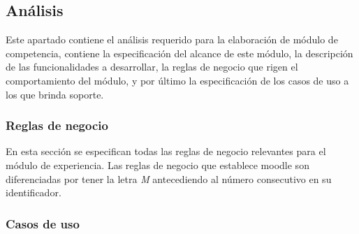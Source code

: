 
\subsection{Análisis}

 Este apartado contiene el análisis requerido para la elaboración de módulo de competencia,
 contiene la especificación del alcance de este módulo, la descripción de las funcionalidades
 a desarrollar, la reglas de negocio que rigen el comportamiento del módulo, y por último la
 especificación de los casos de uso a los que brinda soporte.


\subsubsection{Reglas de negocio} %

 En esta sección se especifican todas las reglas de negocio relevantes para el módulo de
 experiencia. Las reglas de negocio que establece moodle son diferenciadas por tener la letra {\it M}
 antecediendo al número consecutivo en su identificador.



\clearpage
\subsubsection{Casos de uso} %

